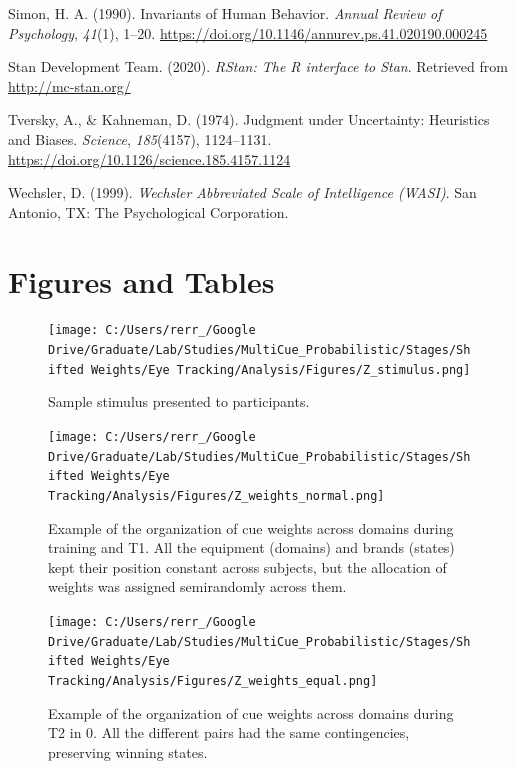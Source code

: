 \documentclass[
  english,
  man]{apa6}
\newlength{\cslhangindent}
\newenvironment{cslreferences}%
  {\setlength{\parindent}{0pt}%
  \everypar{\setlength{\hangindent}{\cslhangindent}}\ignorespaces}%
  {\par}
\begin{document}
\begin{cslreferences}
\leavevmode\hypertarget{ref-simonInvariantsHumanBehavior1990}{}%
Simon, H. A. (1990). Invariants of Human Behavior. \emph{Annual Review of Psychology}, \emph{41}(1), 1--20. \url{https://doi.org/10.1146/annurev.ps.41.020190.000245}

\leavevmode\hypertarget{ref-R-rstan}{}%
Stan Development Team. (2020). \emph{RStan: The R interface to Stan}. Retrieved from \url{http://mc-stan.org/}

\leavevmode\hypertarget{ref-tverskyJudgmentUncertaintyHeuristics1974}{}%
Tversky, A., \& Kahneman, D. (1974). Judgment under Uncertainty: Heuristics and Biases. \emph{Science}, \emph{185}(4157), 1124--1131. \url{https://doi.org/10.1126/science.185.4157.1124}

\leavevmode\hypertarget{ref-wechslerWechslerAbbreviatedScale1999}{}%
Wechsler, D. (1999). \emph{Wechsler Abbreviated Scale of Intelligence (WASI)}. San Antonio, TX: The Psychological Corporation.
\end{cslreferences}

\endgroup

\hypertarget{figures-and-tables}{%
\section{Figures and Tables}\label{figures-and-tables}}

\begin{figure}
\centering
\texttt{[image: C:/Users/rerr\_/Google Drive/Graduate/Lab/Studies/MultiCue\_Probabilistic/Stages/Shifted Weights/Eye Tracking/Analysis/Figures/Z\_stimulus.png]}
\caption{\label{fig:stimulus}Sample stimulus presented to participants.}
\end{figure}

\begin{figure}
\centering
\texttt{[image: C:/Users/rerr\_/Google Drive/Graduate/Lab/Studies/MultiCue\_Probabilistic/Stages/Shifted Weights/Eye Tracking/Analysis/Figures/Z\_weights\_normal.png]}
\caption{\label{fig:weights}Example of the organization of cue weights across domains during training and T1. All the equipment (domains) and brands (states) kept their position constant across subjects, but the allocation of weights was assigned semirandomly across them.}
\end{figure}

\begin{figure}
\centering
\texttt{[image: C:/Users/rerr\_/Google Drive/Graduate/Lab/Studies/MultiCue\_Probabilistic/Stages/Shifted Weights/Eye Tracking/Analysis/Figures/Z\_weights\_equal.png]}
\caption{\label{fig:weights-equal}Example of the organization of cue weights across domains during T2 in 0. All the different pairs had the same contingencies, preserving winning states.}
\end{figure}
\end{document}
